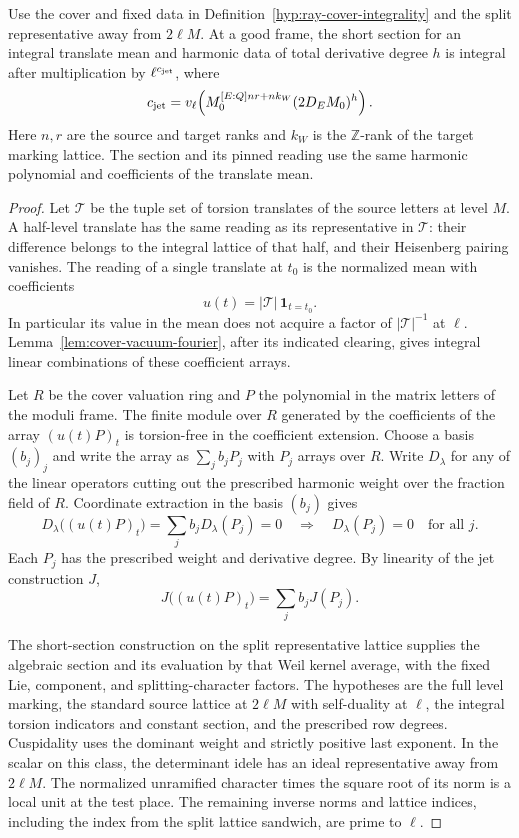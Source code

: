 \begin{lemma}
\label{lem:theta-short-clearing}
Use the cover and fixed data in Definition~\ref{hyp:ray-cover-integrality}
and the split representative away from \(2\ell M\). At a good frame, the short section for an integral
translate mean and harmonic data of total derivative degree \(h\)
is integral after multiplication by \(\ell^{c_{\rm jet}}\), where
\[
 c_{\rm jet}=v_\ell\!\left(
     M_0^{[E:\mathbb Q]nr+n k_W}(2D_E M_0)^h\right).
\]
Here \(n,r\) are the source and target ranks and \(k_W\) is the
\(\mathbb Z\)-rank of the target marking lattice. The section and
its pinned reading use the same harmonic polynomial and
coefficients of the translate mean.
\end{lemma}

\begin{proof}
Let \(\mathcal T\) be the tuple set of torsion translates of the
source letters at level \(M\). A half-level translate has the
same reading as its representative in \(\mathcal T\): their
difference belongs to the integral lattice of that half, and
their Heisenberg pairing vanishes. The reading of a single
translate at \(t_0\) is the normalized mean with coefficients
\[
 u(t)=|\mathcal T|\,\mathbf 1_{t=t_0}.
\]
In particular its value
in the mean does not acquire a factor of \(|\mathcal T|^{-1}\)
at \(\ell\). Lemma~\ref{lem:cover-vacuum-fourier}, after its indicated
clearing, gives integral linear combinations of these coefficient
arrays.

Let \(R\) be the cover valuation ring and \(P\) the polynomial
in the matrix letters of the moduli frame. The finite module over
\(R\) generated by the coefficients of the array \((u(t)P)_t\)
is torsion-free in the coefficient extension. Choose a basis
\((b_j)_j\) and write the array as \(\sum_j b_j P_j\) with
\(P_j\) arrays over \(R\). Write \(D_\lambda\) for any of the linear operators cutting out
the prescribed harmonic weight over the fraction field of \(R\).
Coordinate extraction in the basis \((b_j)\) gives
\[
 D_\lambda\big((u(t)P)_t\big)
        =\sum_j b_jD_\lambda(P_j)=0
        \quad\Longrightarrow\quad D_\lambda(P_j)=0\quad\text{for all \(j\)}.
\]
Each \(P_j\) has the prescribed weight and derivative degree. By linearity of the jet construction \(J\),
\[
 J\big((u(t)P)_t\big)=\sum_j b_j J(P_j).
\]

The short-section construction on the split representative lattice
supplies the algebraic section and its evaluation by that Weil
kernel average, with the fixed Lie, component, and splitting-character
factors. The hypotheses are the full level marking, the standard
source lattice at \(2\ell M\) with self-duality at \(\ell\), the
integral torsion indicators and constant section, and the prescribed
row degrees. Cuspidality uses the dominant weight and strictly
positive last exponent. In the scalar on this class, the determinant
idele has an ideal representative away from \(2\ell M\).
The normalized unramified character times the square root of its
norm is a local unit at the test place. The remaining inverse
norms and lattice indices, including the index from the split
lattice sandwich, are prime to \(\ell\).


\end{proof}

